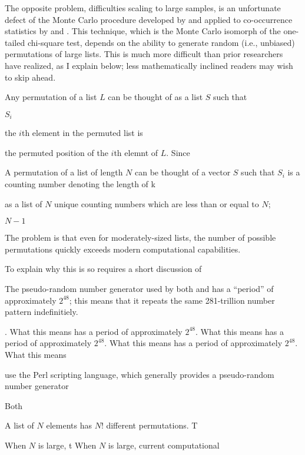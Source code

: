The opposite problem, difficulties scaling to large samples, is an unfortunate defect of the Monte Carlo procedure developed by \citet{Kessler2001} and applied to co-occurrence statistics by \citet{Martin2007,Martin2011} and \citet{Brown2010}. This technique, which is the Monte Carlo isomorph of the one-tailed chi-square test, depends on the ability to generate random (i.e., unbiased) permutations of large lists. This is much more difficult than prior researchers have realized, as I explain below; less mathematically inclined readers may wish to skip ahead. 

Any permutation of a list $L$ can be thought of as a list $S$ such that 

$S_i$ 

the $i$th element in the permuted list is 


the permuted position of the $i$th elemnt of $L$. Since 


A permutation of a list of length $N$ can be thought of a vector $S$ such that $S_i$ is a counting number denoting the length of k

as a list of $N$ unique counting numbers which are less than or equal to $N$; 



$N - 1$ 

The problem is that even for moderately-sized lists, the number of possible permutations quickly exceeds modern computational capabilities. 




To explain why this is so requires a short discussion of


The pseudo-random number generator used by both \citeauthor{Martin2011} and \citeauthor{Brown2010} has a ``period'' of approximately $2 ^ 48$; this means that it repeats the same 281-trillion number pattern indefinitiely. 



. What this means has a period of approximately $2 ^ 48$. What this means has a period of approximately $2 ^ 48$. What this means has a period of approximately $2 ^ 48$. What this means 

use the Perl scripting language, which generally provides a pseudo-random number generator 




Both 

A list of $N$ elements has $N!$ different permutations. T

When $N$ is large, t
When $N$ is large, current computational 

